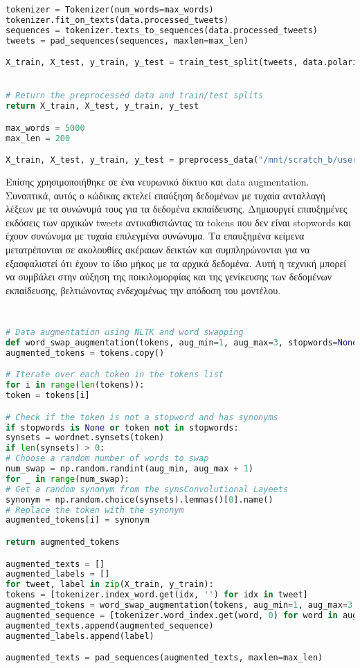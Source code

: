 \begin{lstlisting}[language=Python, caption=Preprocess of Tweets]
tokenizer = Tokenizer(num_words=max_words)
tokenizer.fit_on_texts(data.processed_tweets)
sequences = tokenizer.texts_to_sequences(data.processed_tweets)
tweets = pad_sequences(sequences, maxlen=max_len)

X_train, X_test, y_train, y_test = train_test_split(tweets, data.polarity.values, test_size=0.35, random_state=101)


# Return the preprocessed data and train/test splits
return X_train, X_test, y_train, y_test

max_words = 5000
max_len = 200

X_train, X_test, y_train, y_test = preprocess_data("/mnt/scratch_b/users/v/vaasimak/Documents/models/training.1600000.processed.noemoticon.csv",data_limit=100000, max_words = 5000, max_len = 200)

\end{lstlisting}
\clearpage
Επίσης χρησιμοποιήθηκε σε ένα νευρωνικό δίκτυο και data augmentation. Συνοπτικά, αυτός ο κώδικας εκτελεί επαύξηση δεδομένων με τυχαία ανταλλαγή λέξεων με τα συνώνυμά τους για τα δεδομένα εκπαίδευσης. Δημιουργεί επαυξημένες εκδόσεις των αρχικών tweets αντικαθιστώντας τα tokens που δεν είναι stopwords και έχουν συνώνυμα με τυχαία επιλεγμένα συνώνυμα. Τα επαυξημένα κείμενα μετατρέπονται σε ακολουθίες ακέραιων δεικτών και συμπληρώνονται για να εξασφαλιστεί ότι έχουν το ίδιο μήκος με τα αρχικά δεδομένα. Αυτή η τεχνική μπορεί να συμβάλει στην αύξηση της ποικιλομορφίας και της γενίκευσης των δεδομένων εκπαίδευσης, βελτιώνοντας ενδεχομένως την απόδοση του μοντέλου.


\begin{lstlisting}[language=Python, caption=Data Augmentation]
	
 
# Data augmentation using NLTK and word swapping
def word_swap_augmentation(tokens, aug_min=1, aug_max=3, stopwords=None):
augmented_tokens = tokens.copy()

# Iterate over each token in the tokens list
for i in range(len(tokens)):
token = tokens[i]

# Check if the token is not a stopword and has synonyms
if stopwords is None or token not in stopwords:
synsets = wordnet.synsets(token)
if len(synsets) > 0:
# Choose a random number of words to swap
num_swap = np.random.randint(aug_min, aug_max + 1)
for _ in range(num_swap):
# Get a random synonym from the synsConvolutional Layeets
synonym = np.random.choice(synsets).lemmas()[0].name()
# Replace the token with the synonym
augmented_tokens[i] = synonym

return augmented_tokens

augmented_texts = []
augmented_labels = []
for tweet, label in zip(X_train, y_train):
tokens = [tokenizer.index_word.get(idx, '') for idx in tweet]
augmented_tokens = word_swap_augmentation(tokens, aug_min=1, aug_max=3, stopwords=stopword)
augmented_sequence = [tokenizer.word_index.get(word, 0) for word in augmented_tokens]
augmented_texts.append(augmented_sequence)
augmented_labels.append(label)

augmented_texts = pad_sequences(augmented_texts, maxlen=max_len)
	
\end{lstlisting}
\clearpage

